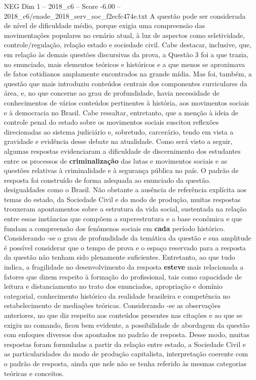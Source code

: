 \begin{textsample}{NEG Dim 1 – 2018\_c6 – Score -6.00 – 2018\_c6/enade\_2018\_serv\_soc\_f2ecfc474e.txt}
A questão pode ser considerada de nível de dificuldade médio, porque exigia uma compreensão das movimentações populares no cenário atual, à luz de aspectos como seletividade, controle/regulação, relação estado e sociedade civil.
Cabe destacar, inclusive, que, em relação às demais questões discursivas da prova, a Questão 3 foi a que trazia, no enunciado, mais elementos teóricos e históricos e a que menos se aproximava de fatos cotidianos amplamente encontrados na grande mídia.
Mas foi, também, a questão que mais introduziu conteúdos centrais dos componentes curriculares da área, e, no que concerne ao grau de profundidade, havia necessidade de conhecimentos de vários conteúdos pertinentes à história, aos movimentos sociais e à democracia no Brasil.
Cabe ressaltar, entretanto, que a menção à ideia de controle penal do estado sobre os movimentos sociais suscitou reflexões direcionadas ao sistema judiciário e, sobretudo, carcerário, tendo em vista a gravidade e evidência desse debate na atualidade.
Como será visto a seguir, algumas respostas evidenciaram a dificuldade de discernimento dos estudantes entre os processos de \textbf{criminalização} das lutas e movimentos sociais e as questões relativas à criminalidade e à segurança pública no país.
O padrão de resposta foi construído de forma adequada ao enunciado da questão. desigualdades como o Brasil.
Não obstante a ausência de referência explícita aos temas do estado, da Sociedade Civil e do modo de produção, muitas respostas trouxeram apontamentos sobre a estrutura da vida social, sustentada na relação entre essas instâncias que compõem a superestrutura e a base econômica e que fundam a compreensão dos fenômenos sociais em \textbf{cada} período histórico.
Considerando -se o grau de profundidade da temática da questão e sua amplitude é possível considerar que o tempo de prova e o espaço reservado para a resposta da questão não tenham sido plenamente suficientes.
Entretanto, ao que tudo indica, a fragilidade no desenvolvimento da resposta \textbf{esteve} mais relacionada a fatores que dizem respeito à formação do profissional, tais como capacidade de leitura e distanciamento no trato dos enunciados, apropriação e domínio categorial, conhecimento histórico da realidade brasileira e competência no estabelecimento de mediações teóricas.
Considerando -se as observações anteriores, no que diz respeito aos conteúdos presentes nas citações e ao que se exigiu no comando, ficou bem evidente, a possibilidade de abordagem da questão com enfoques diversos dos apontados no padrão de resposta.
Desse modo, muitas respostas foram formuladas a partir da relação entre estado, a Sociedade Civil e as particularidades do modo de produção capitalista, interpretação coerente com o padrão de resposta, ainda que nele não se tenha referido às mesmas categorias teóricas e conceitos.

\end{textsample}

